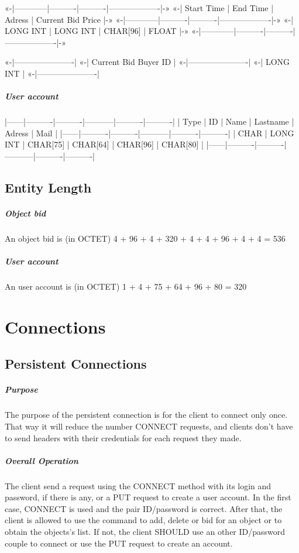 «-|------------|----------|----------|-------------------|-»
«-| Start Time | End Time |  Adress  | Current Bid Price |-»
«-|------------|----------|----------|-------------------|-»
«-|  LONG INT  | LONG INT | CHAR[96] |       FLOAT       |-»
«-|------------|----------|----------|-------------------|-»

«-|----------------------|
«-| Current Bid Buyer ID |
«-|----------------------|
«-|       LONG INT       |
«-|----------------------|
        \paragraph{User account}
|------|----------|----------|-----------|----------|----------|
| Type |    ID    |   Name   |  Lastname |  Adress  |   Mail   |
|------|----------|----------|-----------|----------|----------|
| CHAR | LONG INT | CHAR[75] |  CHAR[64] | CHAR[96] | CHAR[80] |
|------|----------|----------|-----------|----------|----------|
    \section{Entity Length}
        \paragraph{Object bid}
An object bid is (in OCTET)
4 + 96 + 4 + 320 + 4 + 4 + 96 + 4 + 4 = 536
        \paragraph{User account}
An user account is (in OCTET)
1 + 4 + 75 + 64 + 96 + 80 = 320


    \clearpage
\chapter{Connections}
    \section{Persistent Connections}
        \paragraph{Purpose}
The purpose of the persistent connection is for the client to connect
only once. That way it will reduce the number CONNECT requests, and
clients don't have to send headers with their credentials for each request
they made.
        \paragraph{Overall Operation}
The client send a request using the CONNECT method with its login and
password, if there is any, or a PUT request to create a user account.
In the first case, CONNECT is used and the pair ID/password is correct.
After that, the client is allowed to use the command to add, delete or
bid for an object or to obtain the objects's list.
If not, the client SHOULD use an other ID/password couple to connect
or use the PUT request to create an account.
